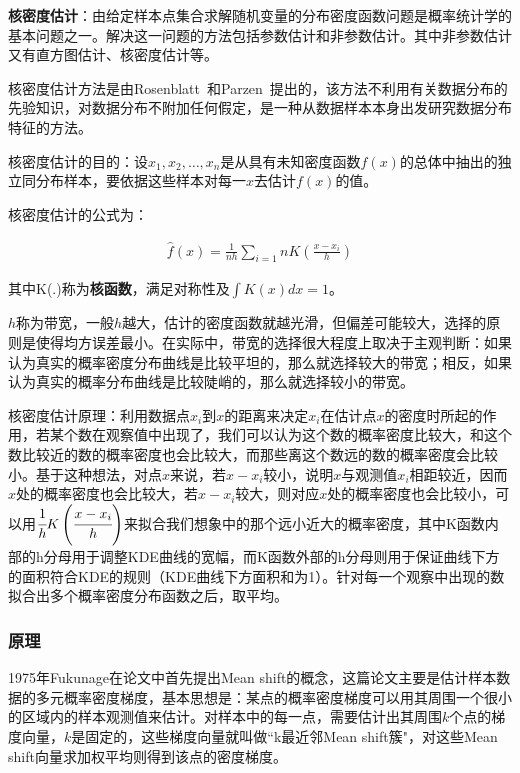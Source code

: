 \documentclass[12pt]{article}
\begin{document}
\textbf{核密度估计}：由给定样本点集合求解随机变量的分布密度函数问题是概率统计学的基本问题之一。解决这一问题的方法包括参数估计和非参数估计。其中非参数估计又有直方图估计、核密度估计等。

核密度估计方法是由Rosenblatt~\cite{rosenblatt1956remarks}和Parzen~\cite{parzen1962estimation}提出的，该方法不利用有关数据分布的先验知识，对数据分布不附加任何假定，是一种从数据样本本身出发研究数据分布特征的方法。

核密度估计的目的：设$x_1, x_2, \ldots, x_n$是从具有未知密度函数$f(x)$的总体中抽出的独立同分布样本，要依据这些样本对每一$x$去估计$f(x)$的值。

核密度估计的公式为：

\begin{align}
\hat{f}(x) = \frac{1}{nh}\sum_{i=1}{n}K(\frac{x-x_i}{h})
\end{align}

其中K(.)称为\textbf{核函数}，满足对称性及$\int K(x)dx=1$。

$h$称为带宽，一般$h$越大，估计的密度函数就越光滑，但偏差可能较大，选择的原则是使得均方误差最小。在实际中，带宽的选择很大程度上取决于主观判断：如果认为真实的概率密度分布曲线是比较平坦的，那么就选择较大的带宽；相反，如果认为真实的概率分布曲线是比较陡峭的，那么就选择较小的带宽。

核密度估计原理：利用数据点$x_i$到$x$的距离来决定$x_i$在估计点$x$的密度时所起的作用，若某个数在观察值中出现了，我们可以认为这个数的概率密度比较大，和这个数比较近的数的概率密度也会比较大，而那些离这个数远的数的概率密度会比较小。基于这种想法，对点$x$来说，若$x-x_i$较小，说明$x$与观测值$x_i$相距较近，因而$x$处的概率密度也会比较大，若$x-x_i$较大，则对应$x$处的概率密度也会比较小，可以用$\cfrac{1}{h}K\left(\cfrac{x-x_i}{h}\right)$来拟合我们想象中的那个远小近大的概率密度，其中K函数内部的h分母用于调整KDE曲线的宽幅，而K函数外部的h分母则用于保证曲线下方的面积符合KDE的规则（KDE曲线下方面积和为1）。针对每一个观察中出现的数拟合出多个概率密度分布函数之后，取平均。

\subsubsection{原理}

1975年Fukunage在论文\cite{fukunaga1975estimation}中首先提出Mean shift的概念，这篇论文主要是估计样本数据的多元概率密度梯度，基本思想是：某点的概率密度梯度可以用其周围一个很小的区域内的样本观测值来估计。对样本中的每一点，需要估计出其周围$k$个点的梯度向量，$k$是固定的，这些梯度向量就叫做“k最近邻Mean shift簇"，对这些Mean shift向量求加权平均则得到该点的密度梯度。
\end{document}
